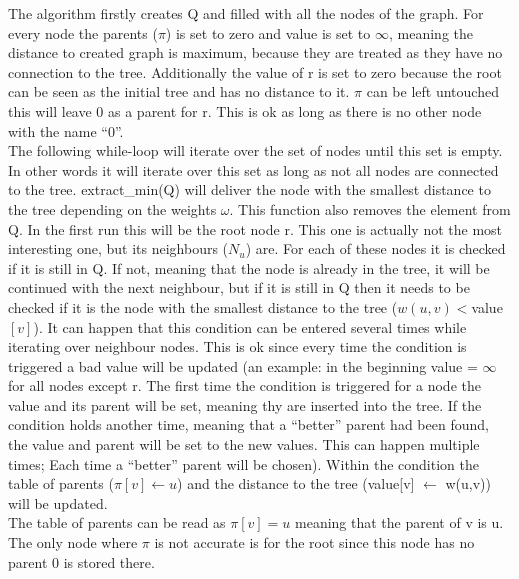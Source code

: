 
The algorithm firstly creates Q and filled with all the nodes of the graph. For every node the parents ($\pi$) is set to zero and value is set to $\infty$, meaning the distance to created graph is maximum, because they are treated as they have no connection to the tree. Additionally the value of r is set to zero because the root can be seen as the initial tree and has no distance to it. $\pi$ can be left untouched this will leave 0 as a parent for r. This is ok as long as there is no other node with the name ``0''.\\
The following while-loop will iterate over the set of nodes until this set is empty. In other words it will iterate over this set as long as not all nodes are connected to the tree. extract\_min(Q) will deliver the node with the smallest distance to the tree depending on the weights $\omega$. This function also removes the element from Q. In the first run this will be the root node r. This one is actually  not the most interesting one, but its neighbours ($N_u$) are. For each of these nodes it is checked if it is still in Q. If not, meaning that the node is already in the tree, it will be continued with the next neighbour, but if it is still in Q then it needs to be checked if it is the node with the smallest distance to the tree ($w(u,v) < $value$[v]$). It can happen that this condition can be entered several times while iterating over neighbour nodes. This is ok since every time the condition is triggered a bad value will be updated (an example: in the beginning value = $\infty$ for all nodes except r. The first time the condition is triggered for a node the value and its parent will be set, meaning thy are inserted into the tree. If the condition holds another time, meaning that a ``better'' parent had been found, the value and parent will be set to the new values. This can happen multiple times; Each time a ``better'' parent will be chosen). Within the condition the table of parents ($\pi[v] \leftarrow u$) and the distance to the tree (value[v] $\leftarrow$ w(u,v)) will be updated.\\
The table of parents can be read as $\pi[v] = u$ meaning that the parent of v is u. The only node where $\pi$ is not accurate is for the root since this node has no parent 0 is stored there.

